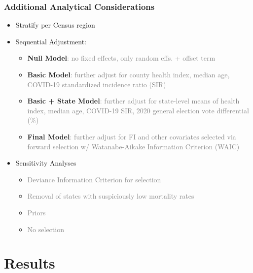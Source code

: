 \documentclass[aspectratio=169]{beamer}
\begin{document}
	
    \begin{frame}
	\frametitle{Additional Analytical Considerations}
	\begin{itemize}
		\item Stratify per Census region
		\item Sequential Adjustment:
		\begin{itemize}
			\item \textbf{Null Model}\textcolor{gray}{: no fixed effects, only random effs. + offset term}
			\item \textbf{Basic Model}\textcolor{gray}{: further adjust for county health index, median age, COVID-19 standardized incidence ratio (SIR)}
			\item \textbf{Basic + State Model}\textcolor{gray}{: further adjust for state-level means of health index, median age, COVID-19 SIR, 2020 general election vote differential (\%)}
			\item \textbf{Final Model}\textcolor{gray}{: further adjust for FI and other covariates selected via forward selection w/ Watanabe-Aikake Information Criterion (WAIC)}
		\end{itemize}
		
		\item Sensitivity Analyses
		\begin{itemize}
			\item \textcolor{gray}{Deviance Information Criterion for selection}
			\item \textcolor{gray}{Removal of states with suspiciously low mortality rates}
			\item \textcolor{gray}{Priors}
			\item \textcolor{gray}{No selection}
		\end{itemize}
		
	\end{itemize}
\end{frame}



\section{Results}
\end{document}
